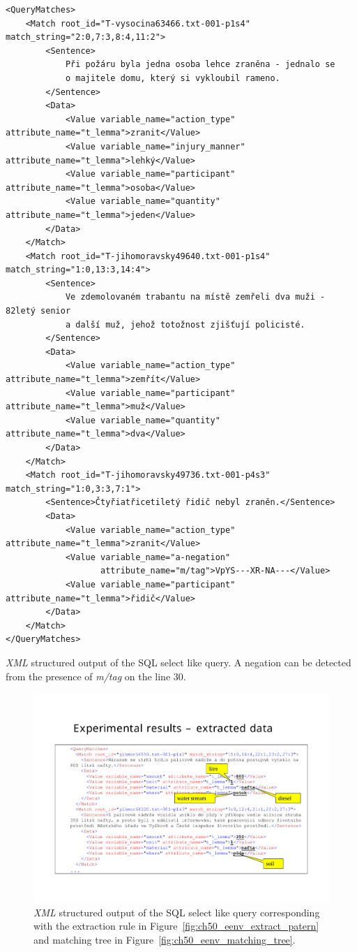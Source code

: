 \begin{listing}[ht]
\begin{verbatim}
<QueryMatches>
	<Match root_id="T-vysocina63466.txt-001-p1s4" match_string="2:0,7:3,8:4,11:2">
		<Sentence>
			Při požáru byla jedna osoba lehce zraněna - jednalo se
			o majitele domu, který si vykloubil rameno.
		</Sentence>
		<Data>
			<Value variable_name="action_type" attribute_name="t_lemma">zranit</Value>
			<Value variable_name="injury_manner" attribute_name="t_lemma">lehký</Value>
			<Value variable_name="participant" attribute_name="t_lemma">osoba</Value>
			<Value variable_name="quantity" attribute_name="t_lemma">jeden</Value>
		</Data>
	</Match>
	<Match root_id="T-jihomoravsky49640.txt-001-p1s4" match_string="1:0,13:3,14:4">
		<Sentence>
			Ve zdemolovaném trabantu na místě zemřeli dva muži - 82letý senior
			a další muž, jehož totožnost zjišťují policisté.
		</Sentence>
		<Data>
			<Value variable_name="action_type" attribute_name="t_lemma">zemřít</Value>
			<Value variable_name="participant" attribute_name="t_lemma">muž</Value>
			<Value variable_name="quantity" attribute_name="t_lemma">dva</Value>
		</Data>
	</Match>
	<Match root_id="T-jihomoravsky49736.txt-001-p4s3" match_string="1:0,3:3,7:1">
		<Sentence>Čtyřiatřicetiletý řidič nebyl zraněn.</Sentence>
		<Data>
			<Value variable_name="action_type" attribute_name="t_lemma">zranit</Value>
			<Value variable_name="a-negation" 
			       attribute_name="m/tag">VpYS---XR-NA---</Value>
			<Value variable_name="participant" attribute_name="t_lemma">řidič</Value>
		</Data>
	</Match>
</QueryMatches>
\end{verbatim}
\caption{\emph{XML} structured output of the SQL select like query. A negation can be detected from the presence of \emph{m/tag} on the line 30.}
\label{lst:select_xml}
\end{listing}

\begin{figure}
	\centering
		\includegraphics[angle=-90, width=0.7\hsize]{eenv_results}
	\caption{\emph{XML} structured output of the SQL select like query corresponding with the extraction rule in Figure~\ref{fig:ch50_eenv_extract_patern} and matching tree in Figure~\ref{fig:ch50_eenv_matching_tree}.}
	\label{fig:ch50_eenv_results}
\end{figure}





